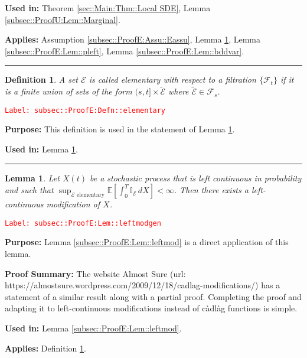 \documentclass[12pt]{article}
\newcommand{\mb}{\mathbb}
\newcommand{\mc}{\mathcal}
\newcommand{\te}{\text}
\newcommand{\tr}{\textcolor{red}}
\newcommand{\labe}[1]{\tr{\texttt{Label: #1}}}
\newcommand{\purpose}{\textbf{Purpose: }}
\newcommand{\pfsum}{\textbf{Proof Summary: }}
\newcommand{\usein}{\textbf{Used in: }}
\newcommand{\app}{\textbf{Applies: }}
\newcommand{\lin}{\rule{\linewidth}{0.4 pt}}
\newcommand{\ex}[1]{\mb{E}\left[#1\right]}			%
\newcommand{\T}{T}								%
\renewcommand{\t}{t}							%
\renewcommand{\tt}{s}							%
\newcommand{\F}{\mc{F}}							%
\newcommand{\X}{X}								%
\newcommand{\tp}[1]{(#1)}						%
\newcommand{\ts}[1]{_{#1}}						%
\newcommand{\alt}[1]{\widetilde{#1}}			%
\newcommand{\evnt}{\mc{E}}						%
\newtheorem{lem}[thms]{Lemma}
\newtheorem{defn}[thms]{Definition}
\begin{document}
\usein Theorem \ref{sec::Main:Thm::Local SDE}, Lemma \ref{subsec::ProofU:Lem::Marginal}.

\app Assumption \ref{subsec::ProofE:Assu::Eassu}, Lemma \ref{subsec::ProofE:Lem::leftmodgen}, Lemma \ref{subsec::ProofE:Lem::pleft}, Lemma \ref{subsec::ProofE:Lem::bddvar}.

\lin

\begin{defn}
A set \(\evnt\) is called elementary with respect to a filtration \(\{\F\ts{\t}\}\) if it is a finite union of sets of the form \((\tt,\t]\times \alt{\evnt}\) where \(\alt{\evnt} \in \F\ts{\tt}\).
\label{subsec::ProofE:Defn::elementary}
\end{defn}
\labe{subsec::ProofE:Defn::elementary}

\purpose This definition is used in the statement of Lemma \ref{subsec::ProofE:Lem::leftmodgen}.

\usein Lemma \ref{subsec::ProofE:Lem::leftmodgen}.

\lin

\begin{lem}
Let \(\X\tp{\t}\) be a stochastic process that is left continuous in probability and such that \(\sup_{\evnt\te{ elementary}}\ex{\int_0^\T \mb{I}_\evnt\,d\X} < \infty\). Then there exists a left-continuous modification of \(\X\).
\label{subsec::ProofE:Lem::leftmodgen}
\end{lem}
\labe{subsec::ProofE:Lem::leftmodgen}

\purpose Lemma \ref{subsec::ProofE:Lem::leftmod} is a direct application of this lemma.

\pfsum The website Almost Sure (url: https://almostsure.wordpress.com/2009/12/18/cadlag-modifications/) has a statement of a similar result along with a partial proof. Completing the proof and adapting it to left-continuous modifications instead of c\`adl\`ag functions is simple.

\usein Lemma \ref{subsec::ProofE:Lem::leftmod}.

\app Definition \ref{subsec::ProofE:Defn::elementary}.
\end{document}
